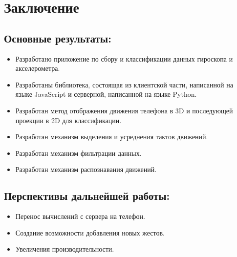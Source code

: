 \section{Заключение}
\subsection{Основные результаты:}
\begin{itemize}
    \item Разработано приложение по сбору и классификации данных гироскопа и акселерометра.
    \item Разработаны библиотека, состоящая из клиентской части, написанной на языке JavaScript и серверной, написанной на языке Python.
    \item Разработан метод отображения движения телефона в 3D и последующей проекции в 2D для классификации.
    \item Разработан механизм выделения и усреднения тактов движений.
    \item Разработан механизм фильтрации данных.
    \item Разработан механизм распознавания движений.
\end{itemize}

\subsection{Перспективы дальнейшей работы:}
\begin{itemize}
    \item Перенос вычислений с сервера на телефон.
    \item Создание возможности добавления новых жестов.
    \item Увеличения производительности.
\end{itemize}